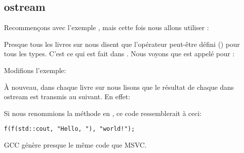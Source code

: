 \subsection{ostream}

Recommençons avec l'exemple , mais cette fois nous allons utiliser
:



Presque tous les livres sur \Cpp nous disent que l'opérateur \TT{<<} peut-être défini
() pour tous les types.
C'est ce qui est fait dans .
Nous voyons que  est appelé pour :



Modifions l'exemple:



À nouveau, dans chaque livre sur \Cpp nous lisons que le résultat de chaque 
dans ostream est transmis au suivant.
En effet:



Si nous renommions la méthode  en \ttf{}, ce code ressemblerait
à ceci:

\begin{lstlisting}[style=customc]
f(f(std::cout, "Hello, "), "world!");
\end{lstlisting}

GCC génère presque le même code que MSVC.

